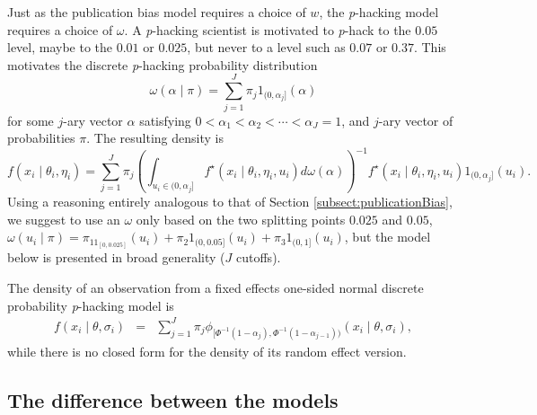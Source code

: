 \documentclass[useAMS,usenatbib,referee]{biom}
\begin{document}
Just as the publication bias model requires a choice of $w$, the \textit{p}-hacking model requires a choice of $\omega$. A \textit{p}-hacking scientist is motivated to \textit{p}-hack to the $0.05$ level, maybe to the $0.01$ or $0.025$, but never to a level such as $0.07$ or $0.37$. This motivates the discrete \textit{p}-hacking probability distribution
$$\omega(\alpha\mid\pi)=\sum_{j=1}^{J}\pi_{j}1_{(0,\alpha_{j}]}(\alpha)$$
for some $j$-ary vector $\alpha$ satisfying $0<\alpha_{1}<\alpha_{2}<\cdots<\alpha_{J}=1$,
and $j$-ary vector of probabilities $\pi$. The resulting density is 
\[
f(x_{i}\mid\theta_{i},\eta_{i})=\sum_{j=1}^{J}\pi_{j}\left(\int_{u_i\in(0,\alpha_{j}]}f^\star(x_{i}\mid\theta_{i},\eta_{i}, u_i)d\omega(\alpha)\right)^{-1}f^\star(x_{i}\mid\theta_{i},\eta_{i}, u_i)1_{(0,\alpha_{j}]}(u_i).
\]
Using a reasoning entirely analogous to that of Section \ref{subsect:publicationBias}, we suggest to use an $\omega$ only based on the two splitting points $0.025$ and $0.05$, $\omega(u_i\mid\pi) = \pi_11_{[0,0.025]}(u_i) + \pi_{2}1_{(0,0.05]}(u_i) + \pi_{3}1_{(0,1]}(u_i)$, but the model below is presented in broad generality ($J$ cutoffs).

The density of an observation from a fixed effects one-sided normal discrete probability \textit{p}-hacking model is
\begin{eqnarray}
f(x_{i}\mid\theta,\sigma_{i}) & = & \sum_{j=1}^{J}\pi_{j}\phi_{[\Phi^{-1}(1-\alpha_{j}),\Phi^{-1}(1-\alpha_{j-1}))}(x_{i}\mid\theta,\sigma_{i}),
\end{eqnarray}
while there is no closed form for the density of its random effect version.

\subsection{The difference between the models\label{subsec:Selection sets, meta analysis}}


\end{document}
